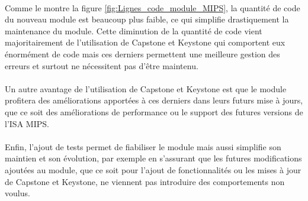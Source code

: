 \documentclass[11pt, book, english, french, standardlists]{upmethodology-document}
\begin{document}
			\paragraph*{}
				Comme le montre la figure \ref{fig:Lignes_code_module_MIPS}, la quantité de code du nouveau module est beaucoup plus faible, ce qui simplifie drastiquement la maintenance du module. Cette diminution de la quantité de code vient majoritairement de l'utilisation de Capstone et Keystone qui comportent eux énormément de code mais ces derniers permettent une meilleure gestion des erreurs et surtout ne nécessitent pas d'être maintenu.
			\paragraph*{}
				Un autre avantage de l'utilisation de Capstone et Keystone est que le module profitera des améliorations apportées à ces derniers dans leurs futurs mise à jours, que ce soit des améliorations de performance ou le support des futures versions de l'\gls{ISA} \gls{MIPS}.
			\paragraph*{}
				Enfin, l'ajout de tests permet de fiabiliser le module mais aussi simplifie son maintien et son évolution, par exemple en s'assurant que les futures modifications ajoutées au module, que ce soit pour l'ajout de fonctionnalités ou les mises à jour de Capstone et Keystone, ne viennent pas introduire des comportements non voulus.
	\nocite{*}
	
	
	\printglossary[type=\acronymtype,title=Lexique,toctitle=Lexique]{}
		\setcounter{section}{0}
		\renewcommand{\thesection}{\Alph{section}}
		\renewcommand{\theHsection}{appendixsection.\Alph{section}}
\end{document}
